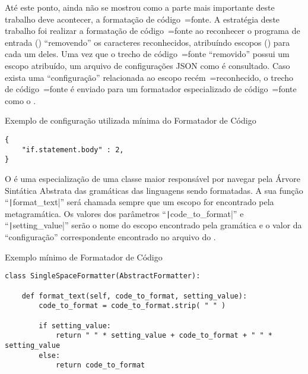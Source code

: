 Até este ponto,
ainda não se mostrou como a parte mais importante deste trabalho deve acontecer,
a formatação de código~=fonte.
A estratégia deste trabalho foi realizar a formatação de código~=fonte ao reconhecer o programa de entrada () ``removendo'' os caracteres reconhecidos,
atribuíndo escopos () para cada um deles.
Uma vez que o trecho de código~=fonte ``removido'' possui um escopo atribuído,
um arquivo de configurações JSON como  é consultado.
Caso exista uma ``configuração'' relacionada ao escopo recém~=reconhecido,
o trecho de código~=fonte é enviado para um formatador especializado de código~=fonte como o .
\begin{code}
\caption{Exemplo de configuração utilizada mínima do Formatador de Código}
\label{code:exemploDeConfiguracaoUtilizadaMinimaDoFormatadorDeCodigo}
\begin{verbatim}
{
    "if.statement.body" : 2,
}
\end{verbatim}
\end{code}

O  é uma especialização de uma classe maior responsável por navegar pela Árvore Sintática Abstrata das gramáticas das linguagens sendo formatadas.
A sua função ``\texttt|format_text|'' será chamada sempre que um escopo for encontrado pela metagramática.
Os valores dos parâmetros ``\texttt|code_to_format|'' e
``\texttt|setting_value|'' serão o nome do escopo encontrado pela gramática e
o valor da ``configuração'' correspondente encontrado no arquivo do .
\begin{code}
\caption{Exemplo mínimo de Formatador de Código}
\label{code:exemploMinimoDeFormatadorDeCodigo}
\begin{verbatim}
class SingleSpaceFormatter(AbstractFormatter):

    def format_text(self, code_to_format, setting_value):
        code_to_format = code_to_format.strip( " " )

        if setting_value:
            return " " * setting_value + code_to_format + " " * setting_value
        else:
            return code_to_format
\end{verbatim}
\end{code}

